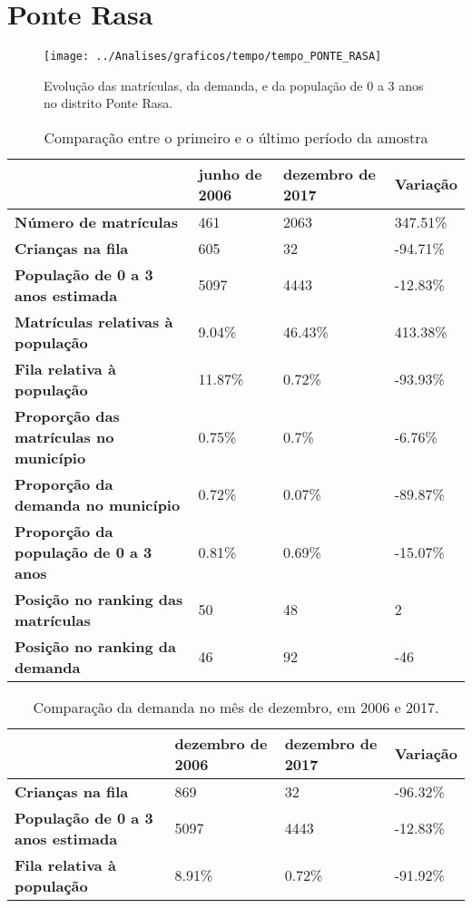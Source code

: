\section{Ponte Rasa}
\begin{figure}[H]
\centering
\texttt{[image: ../Analises/graficos/tempo/tempo\_PONTE\_RASA]}
\caption{Evolução das matrículas, da demanda, e da população de 0 a 3 anos no distrito Ponte Rasa.}
\end{figure}
\begin{table}[H]
\begin{tabular}{|l|l|l|l|}
\hline
\textbf{}                                      & \textbf{junho de 2006}       & \textbf{dezembro de 2017}    & \textbf{Variação} \\ \hline
\textbf{Número de matrículas}                  & 461 & 2063 & 347.51\% \\ \hline
\textbf{Crianças na fila}                      & 605 & 32 & -94.71\% \\ \hline
\textbf{População de 0 a 3 anos estimada}      & 5097 & 4443 & -12.83\% \\ \hline
\textbf{Matrículas relativas à população}      & 9.04\% & 46.43\% & 413.38\% \\ \hline
\textbf{Fila relativa à população}             & 11.87\% & 0.72\% & -93.93\% \\ \hline
\textbf{Proporção das matrículas no município} & 0.75\% & 0.7\% & -6.76\% \\ \hline
\textbf{Proporção da demanda no município}     & 0.72\% & 0.07\% & -89.87\% \\ \hline
\textbf{Proporção da população de 0 a 3 anos}  & 0.81\% & 0.69\% & -15.07\% \\ \hline
\textbf{Posição no ranking das matrículas}     & 50 & 48 & 2 \\ \hline
\textbf{Posição no ranking da demanda}         & 46 & 92 & -46 \\ \hline
\end{tabular}
\caption{Comparação entre o primeiro e o último período da amostra}
\end{table}
\begin{table}[H]
\begin{tabular}{|l|l|l|l|}
\hline
\textbf{}                                 & \textbf{dezembro de 2006} & \textbf{dezembro de 2017} & \textbf{Variação} \\ \hline
\textbf{Crianças na fila}                      & 869 & 32 & -96.32\% \\ \hline
\textbf{População de 0 a 3 anos estimada}      & 5097 & 4443 & -12.83\% \\ \hline
\textbf{Fila relativa à população}             & 8.91\% & 0.72\% & -91.92\% \\ \hline
\end{tabular}
\caption{Comparação da demanda no mês de dezembro, em 2006 e 2017.}
\end{table}
